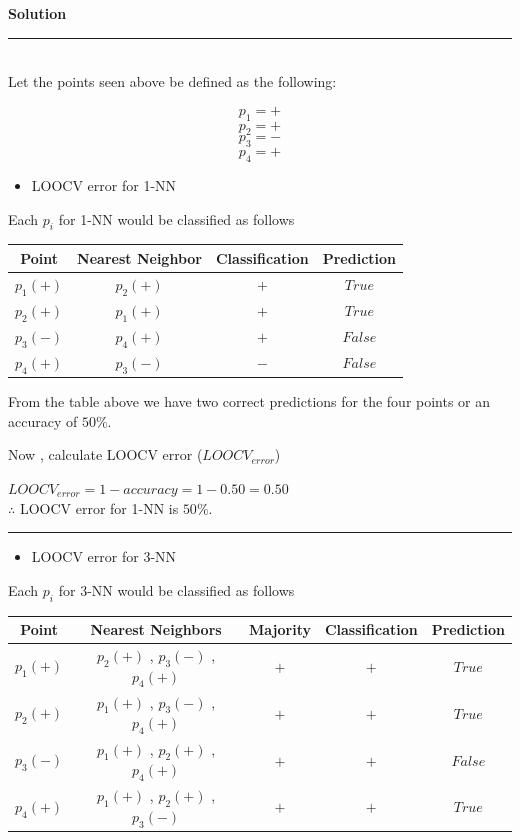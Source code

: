 \documentclass{article}
\begin{document}
\textbf{Solution}

\noindent\rule{\textwidth}{0.4pt}\\

Let the points seen above be defined as the following:

$$p_1 = +$$
$$p_2 = +$$
$$p_3 = -$$
$$p_4 = +$$

\begin{itemize}
    \item LOOCV error for 1-NN
\end{itemize}


Each $p_i$ for 1-NN would be classified as follows

\begin{center}
\begin{tabular}{|c|c|c|c|}
\hline
Point & Nearest Neighbor & Classification & Prediction \\
\hline
$p_1(+)$ & $p_2(+)$ & $+$ & $True$ \\
$p_2(+)$ & $p_1(+)$ & $+$ & $True$ \\
$p_3(-)$ & $p_4(+)$ & $+$ & $False$ \\
$p_4(+)$ & $p_3(-)$ & $-$ & $False$ \\
\hline
\end{tabular}
\end{center}

From the table above we have two correct predictions for the four points or an accuracy of $50\%$.

Now , calculate LOOCV error ($LOOCV_{error}$)

$LOOCV_{error} = 1 - accuracy = 1 - 0.50 = 0.50$\\

$\therefore$ LOOCV error for 1-NN is $50\%$.

\noindent\rule{\textwidth}{0.4pt}

\begin{itemize}
    \item LOOCV error for 3-NN
\end{itemize}

Each $p_i$ for 3-NN would be classified as follows

\begin{center}
\begin{tabular}{|c|c|c|c|c|}
\hline
Point & Nearest Neighbors & Majority & Classification & Prediction \\ 
\hline
$p_1(+)$ & $p_2(+)$ , $p_3(-)$ , $p_4(+)$ & $+$ & $+$ & $True$ \\
$p_2(+)$ & $p_1(+)$ , $p_3(-)$ , $p_4(+)$ & $+$ & $+$ & $True$ \\
$p_3(-)$ & $p_1(+)$ , $p_2(+)$ , $p_4(+)$ & $+$ & $+$ & $False$ \\
$p_4(+)$ & $p_1(+)$ , $p_2(+)$ , $p_3(-)$ & $+$ & $+$ & $True$ \\
\hline
\end{tabular}
\end{center}
\end{document}
